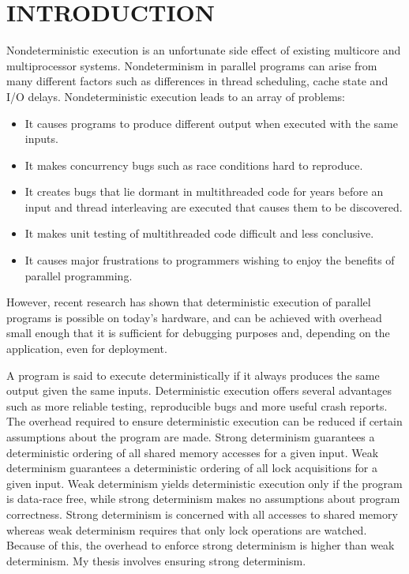 \chapter{INTRODUCTION}

Nondeterministic execution is an unfortunate side effect of existing
multicore and multiprocessor systems.  Nondeterminism in parallel
programs can arise from many different factors such as differences in
thread scheduling, cache state and I/O delays.  Nondeterministic
execution leads to an array of problems:

\begin{itemize}
\item It causes programs to produce different output when executed
  with the same inputs.

\item It makes concurrency bugs such as race conditions hard to
  reproduce.

\item It creates bugs that lie dormant in multithreaded code for years
  before an input and thread interleaving are executed that causes
  them to be discovered.

\item It makes unit testing of multithreaded code difficult and less
  conclusive.

\item It causes major frustrations to programmers wishing to enjoy the
  benefits of parallel programming.
\end{itemize}

However, recent research has shown that deterministic execution of
parallel programs is possible on today's hardware, and can be achieved
with overhead small enough that it is sufficient for debugging
purposes and, depending on the application, even for deployment.

A program is said to execute deterministically if it always produces
the same output given the same inputs.  Deterministic execution offers
several advantages such as more reliable testing, reproducible bugs
and more useful crash reports.  The overhead required to ensure
deterministic execution can be reduced if certain assumptions about
the program are made.  Strong determinism guarantees a deterministic
ordering of all shared memory accesses for a given input.  Weak
determinism guarantees a deterministic ordering of all lock
acquisitions for a given input.  Weak determinism yields deterministic
execution only if the program is data-race free, while strong
determinism makes no assumptions about program correctness.  Strong
determinism is concerned with all accesses to shared memory whereas
weak determinism requires that only lock operations are watched.
Because of this, the overhead to enforce strong determinism is higher
than weak determinism.  My thesis involves ensuring strong
determinism.

